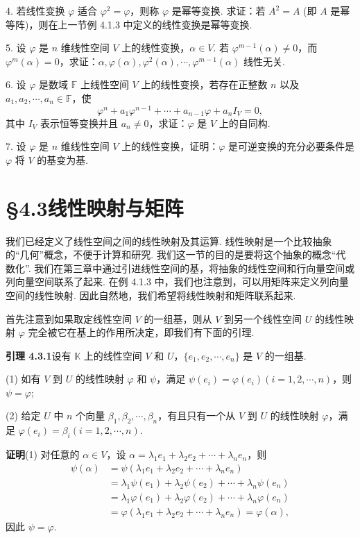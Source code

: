 \documentclass[UTF8, 12pt, fontset=fandol, oneside]{ctexart}
\begin{document}
4. 若线性变换 $\varphi$ 适合 $\varphi^2=\varphi$，则称 $\varphi$ 是幂等变换. 求证：若 $A^2=A$ (即 $A$ 是幂等阵)，则在上一节例 4.1.3 中定义的线性变换是幂等变换.

5. 设 $\varphi$ 是 $n$ 维线性空间 $V$ 上的线性变换，$\alpha\in V$. 若 $\varphi^{m-1}(\alpha)\neq 0$，而 $\varphi^m(\alpha)=0$，求证：$\alpha,\varphi(\alpha),\varphi^2(\alpha),\cdots,\varphi^{m-1}(\alpha)$ 线性无关.

6. 设 $\varphi$ 是数域 $\mathbb{F}$ 上线性空间 $V$ 上的线性变换，若存在正整数 $n$ 以及 $a_1,a_2,\cdots,a_n\in\mathbb{F}$，使
\[
\varphi^n+a_1\varphi^{n-1}+\cdots+a_{n-1}\varphi+a_nI_V=0,
\]
其中 $I_V$ 表示恒等变换并且 $a_n\neq 0$，求证：$\varphi$ 是 $V$ 上的自同构.

7. 设 $\varphi$ 是 $n$ 维线性空间 $V$ 上的线性变换，证明：$\varphi$ 是可逆变换的充分必要条件是 $\varphi$ 将 $V$ 的基变为基.

\section*{§4.3\quad 线性映射与矩阵}

我们已经定义了线性空间之间的线性映射及其运算. 线性映射是一个比较抽象的“几何”概念，不便于计算和研究. 我们这一节的目的是要将这个抽象的概念“代数化”. 我们在第三章中通过引进线性空间的基，将抽象的线性空间和行向量空间或列向量空间联系了起来. 在例 4.1.3 中，我们也注意到，可以用矩阵来定义列向量空间的线性映射. 因此自然地，我们希望将线性映射和矩阵联系起来.

首先注意到如果取定线性空间 $V$ 的一组基，则从 $V$ 到另一个线性空间 $U$ 的线性映射 $\varphi$ 完全被它在基上的作用所决定，即我们有下面的引理.

\noindent\textbf{引理 4.3.1}\quad 设有 $\mathbb{K}$ 上的线性空间 $V$ 和 $U$，$\{e_1,e_2,\cdots,e_n\}$ 是 $V$ 的一组基.

(1) 如有 $V$ 到 $U$ 的线性映射 $\varphi$ 和 $\psi$，满足 $\psi(e_i)=\varphi(e_i)(i=1,2,\cdots,n)$，则 $\psi=\varphi$;

(2) 给定 $U$ 中 $n$ 个向量 $\beta_1,\beta_2,\cdots,\beta_n$，有且只有一个从 $V$ 到 $U$ 的线性映射 $\varphi$，满足 $\varphi(e_i)=\beta_i(i=1,2,\cdots,n)$.

\noindent\textbf{证明}\quad (1) 对任意的 $\alpha\in V$，设 $\alpha=\lambda_1e_1+\lambda_2e_2+\cdots+\lambda_ne_n$，则
\[
\begin{aligned}
\psi(\alpha)
&=\psi(\lambda_1e_1+\lambda_2e_2+\cdots+\lambda_ne_n)\\
&=\lambda_1\psi(e_1)+\lambda_2\psi(e_2)+\cdots+\lambda_n\psi(e_n)\\
&=\lambda_1\varphi(e_1)+\lambda_2\varphi(e_2)+\cdots+\lambda_n\varphi(e_n)\\
&=\varphi(\lambda_1e_1+\lambda_2e_2+\cdots+\lambda_ne_n)=\varphi(\alpha),
\end{aligned}
\]
因此 $\psi=\varphi$.
\end{document}
